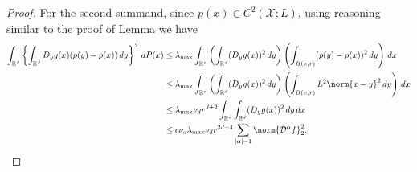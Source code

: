 \documentclass{article}
\newcommand{\Reals}{\mathbb{R}}
\newcommand{\abs}[1]{\left \lvert #1 \right \rvert}
\newcommand{\1}{\mathbf{1}}
\newcommand{\Rd}{\Reals^d}
\newcommand{\domain}{\mathcal{X}}
\newcommand{\Partial}{\mathcal{D}}
\theoremstyle{alden}
\theoremstyle{aldenthm}
\theoremstyle{definition}
\theoremstyle{remark}
\begin{document}
\begin{proof}
	For the second summand, since $p(x) \in C^2(\domain; L)$, using reasoning similar to the proof of Lemma we have
	\begin{align*}
	\int_{\Rd} \left\{\int_{\Rd} D_yg(x) (p(y) - p(x)) \,dy \right\}^2 \,dP(x) & \leq \lambda_{\max} \int_{\Rd} \left(\int_{\Rd}( D_yg(x))^2 \,dy \right) \left(\int_{B(x,r)} (p(y) - p(x))^2 \,dy\right) \,dx \\
	& \leq \lambda_{\max} \int_{\Rd} \left(\int_{\Rd}( D_yg(x))^2 \,dy \right) \left(\int_{B(x,r)} L^2 \norm{x - y}^2 \,dy\right) \,dx \\
	& \leq \lambda_{\max} \nu_d r^{d + 2}\int_{\Rd} \int_{\Rd}( D_yg(x))^2 \,dy \,dx \\
	& \leq c \nu_d  \lambda_{\max} \nu_d r^{2d + 4} \sum_{\abs{\alpha} = 1} \norm{\Partial^{\alpha}f}_2^2.
	\end{align*}
\end{proof}
\end{document}
